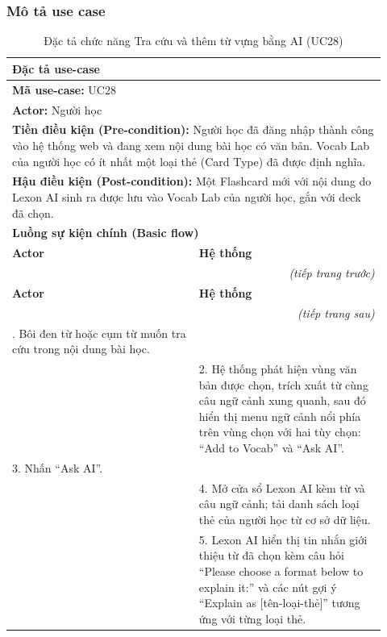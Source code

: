 \subsubsection{Mô tả use case}
\renewcommand{\arraystretch}{1.3}
\begin{longtable}{|p{0.46\linewidth}|p{0.46\linewidth}|}
    \caption{Đặc tả chức năng Tra cứu và thêm từ vựng bằng AI (UC28)} \label{tab:uc28_spec} \\
    \hline
    \multicolumn{2}{|l|}{\textbf{Đặc tả use-case}} \\ \hline
    \multicolumn{2}{|l|}{\textbf{Mã use-case:} UC28} \\ \hline
    \multicolumn{2}{|l|}{\textbf{Actor:} Người học} \\ \hline
    \multicolumn{2}{|p{0.88\linewidth}|}{\textbf{Tiền điều kiện (Pre-condition):} Người học đã đăng nhập thành công vào hệ thống web và đang xem nội dung bài học có văn bản. Vocab Lab của người học có ít nhất một loại thẻ (Card Type) đã được định nghĩa.} \\ \hline
    \multicolumn{2}{|p{0.88\linewidth}|}{\textbf{Hậu điều kiện (Post-condition):} Một Flashcard mới với nội dung do Lexon AI sinh ra được lưu vào Vocab Lab của người học, gắn với deck đã chọn.} \\ \hline
    \multicolumn{2}{|l|}{\textbf{Luồng sự kiện chính (Basic flow)}} \\ \hline
    \textbf{Actor} & \textbf{Hệ thống} \\ \hline
    \endfirsthead
    \multicolumn{2}{r}{\textit{(tiếp trang trước)}} \\
    \hline
    \textbf{Actor} & \textbf{Hệ thống} \\ \hline
    \endhead
    \hline
    \multicolumn{2}{r}{\textit{(tiếp trang sau)}} \\
    \endfoot
    \hline
    \endlastfoot
    1. Bôi đen từ hoặc cụm từ muốn tra cứu trong nội dung bài học. & \\ \hline
    & 2. Hệ thống phát hiện vùng văn bản được chọn, trích xuất từ cùng câu ngữ cảnh xung quanh, sau đó hiển thị menu ngữ cảnh nổi phía trên vùng chọn với hai tùy chọn: ``Add to Vocab'' và ``Ask AI''. \\ \hline
    3. Nhấn ``Ask AI''. & \\ \hline
    & 4. Mở cửa sổ Lexon AI kèm từ và câu ngữ cảnh; tải danh sách loại thẻ của người học từ cơ sở dữ liệu. \\ \hline
    & 5. Lexon AI hiển thị tin nhắn giới thiệu từ đã chọn kèm câu hỏi ``Please choose a format below to explain it:'' và các nút gợi ý ``Explain as [tên-loại-thẻ]'' tương ứng với từng loại thẻ. \\ \hline

\end{longtable}
